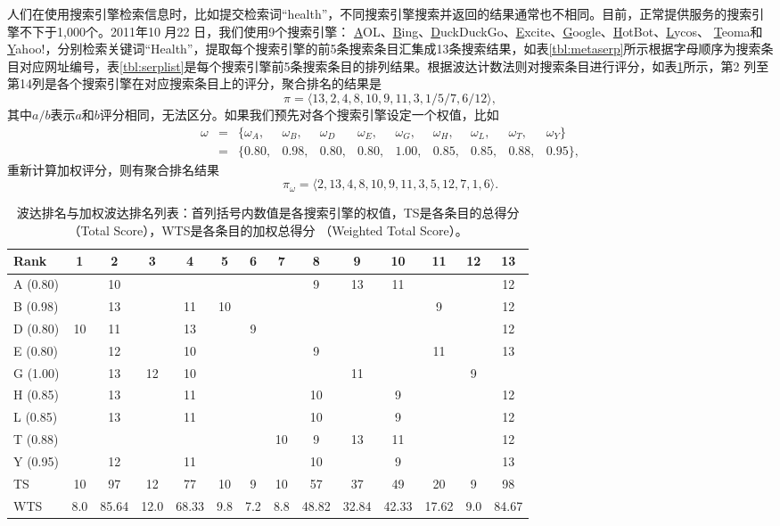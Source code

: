 \begin{example}\label{eg:metasearch}
人们在使用搜索引擎检索信息时，比如提交检索词“health”，不同搜索引擎搜索并返回的结果通常也不相同。目前，正常提供服务的搜索引擎不下于1,000个。2011年10 月22 日，我们使用9个搜索引擎：
\underline{A}OL、\underline{B}ing、\underline{D}uckDuckGo、\underline{E}xcite、\underline{G}oogle、\underline{H}otBot、\underline{L}ycos、
\underline{T}eoma和\underline{Y}ahoo!，分别检索关键词“Health”，提取每个搜索引擎的前5条搜索条目汇集成13条搜索结果，如表\ref{tbl:metaserp}所示根据字母顺序为搜索条目对应网址编号，表\ref{tbl:serplist}是每个搜索引擎前5条搜索条目的排列结果。根据波达计数法则对搜索条目进行评分，如表\ref{tbl:bordarank}所示，第2 列至第14列是各个搜索引擎在对应搜索条目上的评分，聚合排名的结果是
\[
    \pi = \langle 13,2,4,8,10,9,11,3,1/5/7,6/12\rangle,
\]
其中$a/b$表示$a$和$b$评分相同，无法区分。如果我们预先对各个搜索引擎设定一个权值，比如
\[
\begin{array}{lcccccccccl}
    \omega &= &\{\omega_A,& \omega_B, & \omega_D & \omega_E, & \omega_G, & \omega_H, & \omega_L,&\omega_T, & \omega_Y\} \\
    &= & \{0.80, & 0.98, & 0.80, & 0.80, & 1.00, & 0.85, & 0.85, & 0.88, & 0.95\},
\end{array}
\]
重新计算加权评分，则有聚合排名结果
\[
    \pi_\omega = \langle 2,13,4,8,10,9,11,3,5,12,7,1,6\rangle.
\]
\end{example}
\begin{table}[htbp]
\centering
\begin{tabular}{|l|c|c|c|c|c|c|c|c|c|c|c|c|c|}
\hline
Rank & 1 & 2 & 3 & 4 & 5 & 6 & 7 & 8 & 9 & 10 & 11 & 12 & 13\\
\hline
A (0.80) &  & 10 &  &  &  &  &  & 9 & 13 & 11 &  &  & 12\\
B (0.98) &  & 13 &  & 11 & 10 &  &  &  &  &  & 9 &  & 12\\
D (0.80) & 10 & 11 &  & 13 &  & 9 &  &  &  &  &  &  & 12\\
E (0.80) &  & 12 &  & 10 &  &  &  & 9 &  &  & 11 &  & 13\\
G (1.00) &  & 13 & 12 & 10 &  &  &  &  & 11 &  &  & 9 &  \\
H (0.85) &  & 13 &  & 11 &  &  &  & 10 &  & 9 &  &  & 12\\
L (0.85) &  & 13 &  & 11 &  &  &  & 10 &  & 9 &  &  & 12\\
T (0.88) &  &  &  &  &  &  & 10 & 9 & 13 & 11 &  &  & 12\\
Y (0.95) &  & 12 &  & 11 &  &  &  & 10 &  & 9 &  &  & 13 \\
\hline
TS & 10 & 97 & 12 & 77 & 10 & 9 & 10 & 57 & 37 & 49 & 20 & 9 & 98\\
\hline
WTS & 8.0 & 85.64 & 12.0 & 68.33 & 9.8 & 7.2 & 8.8 & 48.82 & 32.84 & 42.33 & 17.62 & 9.0 & 84.67\\
\hline
\end{tabular}
\caption{波达排名与加权波达排名列表：首列括号内数值是各搜索引擎的权值，TS是各条目的总得分（Total Score），WTS是各条目的加权总得分
（Weighted Total Score）。}
\label{tbl:bordarank}
\end{table}

